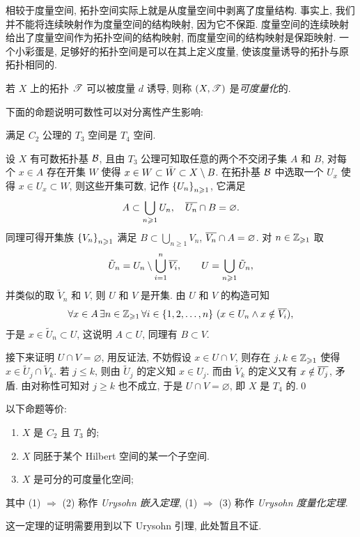     相较于度量空间, 拓扑空间实际上就是从度量空间中剥离了度量结构. 事实上, 我们并不能将连续映射作为度量空间的结构映射, 因为它不保距. 度量空间的连续映射给出了度量空间作为拓扑空间的结构映射, 而度量空间的结构映射是保距映射. 一个小彩蛋是, 足够好的拓扑空间是可以在其上定义度量, 使该度量诱导的拓扑与原拓扑相同的.

    \begin{Definition}[可度量化空间]
        若 $ X $ 上的拓扑 $ \ST $ 可以被度量 $ d $ 诱导, 则称 $ (X,\ST) $ 是\emph{可度量化}的.
    \end{Definition}

    下面的命题说明可数性可以对分离性产生影响:

    \begin{Proposition}
        满足 $ C_2 $ 公理的 $ T_3 $ 空间是 $ T_4 $ 空间.
    \end{Proposition}
    \begin{Proof}
        设 $ X $ 有可数拓扑基 $ \CB $, 且由 $ T_3 $ 公理可知取任意的两个不交闭子集 $ A $ 和 $ B $, 对每个 $ x\in A $ 存在开集 $ W $ 使得 $ x\in W\subset\bar{W}\subset X\sm B $. 在拓扑基 $ \CB $ 中选取一个 $ U_x $ 使得 $ x\in U_x\subset W $, 则这些开集可数, 记作 $ \set{U_n}_{n\geqslant 1} $, 它满足
        \[
            A\subset\bigcup_{n\geqslant 1}U_n,\quad \baro{U_n}\cap B=\varnothing.
        \]
        同理可得开集族 $ \set{V_n}_{n\geqslant 1} $ 满足 $ B\subset\bigcup_{n\geqslant 1}V_n $, $ \baro{V_n}\cap A=\varnothing $. 对 $ n\in\Zi $ 取
        \[
            \tilde{U}_n=U_n\sm\bigcup_{i=1}^n\baro{V_i},\qquad U=\bigcup_{n\geqslant 1}\tilde{U}_n,
        \]
        并类似的取 $ \tilde{V}_n $ 和 $ V $, 则 $ U $ 和 $ V $ 是开集. 由 $ U $ 和 $ V $ 的构造可知
        \[
            \forall x\in A\,\exists n\in\Zi\,\forall i\in\set{1,2,\dots,n}\,(x\in U_n\land x\notin\baro{V_i}),
        \]
        于是 $ x\in\tilde{U}_n\subset U $, 这说明 $ A\subset U $, 同理有 $ B\subset V $.

        接下来证明 $ U\cap V=\varnothing $, 用反证法, 不妨假设 $ x\in U\cap V $, 则存在 $ j,k\in\Zi $ 使得 $ x\in\tilde{U}_j\cap\tilde{V}_k $. 若 $ j\leqslant k $, 则由 $ \tilde{U}_j $ 的定义知 $ x\in U_j $. 而由 $ \tilde{V}_k $ 的定义又有 $ x\notin\baro{U_j} $, 矛盾. 由对称性可知对 $ j\geqslant k $ 也不成立, 于是 $ U\cap V=\varnothing $, 即 $ X $ 是 $ T_4 $ 的.\qed
    \end{Proof}

    \begin{Theorem}\label{thm:可度量化的等价条件}
        以下命题等价:
        \begin{enumerate}
            \item $ X $ 是 $ C_2 $ 且 $ T_3 $ 的;
            \item $ X $ 同胚于某个 Hilbert 空间的某一个子空间.
            \item $ X $ 是可分的可度量化空间;
        \end{enumerate}
        其中 (1) $ \Rightarrow $ (2) 称作\emph{ Urysohn 嵌入定理}, (1) $ \Rightarrow $ (3) 称作\emph{ Urysohn 度量化定理}.
    \end{Theorem}
    \begin{Proof}
        这一定理的证明需要用到以下 Urysohn 引理, 此处暂且不证.
    \end{Proof}

